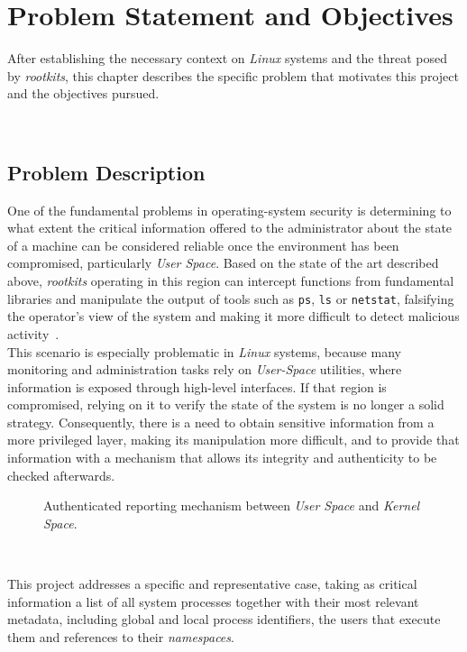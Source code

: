 \chapter{Problem Statement and Objectives}
\label{cap:capitulo4}

After establishing the necessary context on \textit{Linux} systems and the threat posed by \textit{rootkits}, this chapter describes the specific problem that motivates this project and the objectives pursued.

\

\section{Problem Description}

One of the fundamental problems in operating-system security is determining to what extent the critical information offered to the administrator about the state of a machine can be considered reliable once the environment has been compromised, particularly \textit{User Space}.
Based on the state of the art described above, \textit{rootkits} operating in this region can intercept functions from fundamental libraries and manipulate the output of tools such as \texttt{ps}, \texttt{ls} or \texttt{netstat}, falsifying the operator's view of the system and making it more difficult to detect malicious activity~\cite{rootkits}.\\

This scenario is especially problematic in \textit{Linux} systems, because many monitoring and administration tasks rely on \textit{User-Space} utilities, where information is exposed through high-level interfaces.
If that region is compromised, relying on it to verify the state of the system is no longer a solid strategy.
Consequently, there is a need to obtain sensitive information from a more privileged layer, making its manipulation more difficult, and to provide that information with a mechanism that allows its integrity and authenticity to be checked afterwards.\\

\begin{figure}[h!]
  \centering
  \scalebox{0.9}{}
  \caption{Authenticated reporting mechanism between \textit{User Space} and \textit{Kernel Space}.}
  \label{fig:secure_reporting_scheme}
\end{figure}

\

This project addresses a specific and representative case, taking as critical information a list of all system processes together with their most relevant metadata, including global and local process identifiers, the users that execute them and references to their \textit{namespaces}.\\

